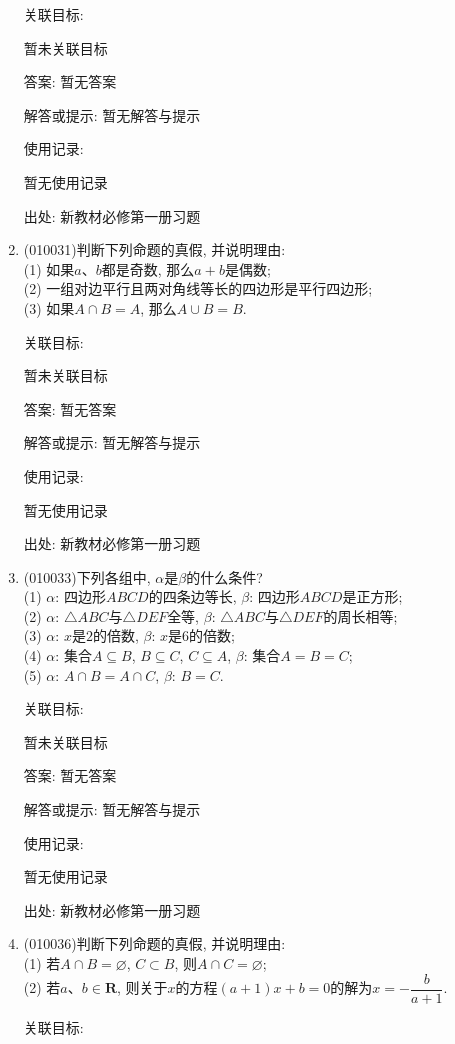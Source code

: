 \documentclass[10pt,a4paper]{article}
\begin{document}
\begin{enumerate}[1.]
关联目标:

暂未关联目标

答案: 暂无答案

解答或提示: 暂无解答与提示

使用记录:

暂无使用记录


出处: 新教材必修第一册习题
\item { (010031)}判断下列命题的真假, 并说明理由:\\
(1) 如果$a$、$b$都是奇数, 那么$a+b$是偶数;\\
(2) 一组对边平行且两对角线等长的四边形是平行四边形;\\
(3) 如果$A\cap B=A$, 那么$A\cup B=B$.


关联目标:

暂未关联目标

答案: 暂无答案

解答或提示: 暂无解答与提示

使用记录:

暂无使用记录


出处: 新教材必修第一册习题
\item { (010033)}下列各组中, $\alpha$是$\beta$的什么条件?\\
(1) $\alpha$: 四边形$ABCD$的四条边等长, $\beta$: 四边形$ABCD$是正方形;\\
(2) $\alpha$: $\triangle ABC$与$\triangle DEF$全等, $\beta$: $\triangle ABC$与$\triangle DEF$的周长相等;\\
(3) $\alpha$: $x$是$2$的倍数, $\beta$: $x$是$6$的倍数;\\
(4) $\alpha$: 集合$A\subseteq B$, $B\subseteq C$, $C\subseteq A$, $\beta$: 集合$A=B=C$;\\
(5) $\alpha$: $A\cap B=A\cap C$, $\beta$: $B=C$.


关联目标:

暂未关联目标

答案: 暂无答案

解答或提示: 暂无解答与提示

使用记录:

暂无使用记录


出处: 新教材必修第一册习题
\item { (010036)}判断下列命题的真假, 并说明理由:\\
(1) 若$A\cap B=\varnothing$, $C\subset B$, 则$A\cap C=\varnothing$;\\
(2) 若$a$、$b\in \mathbf{R}$, 则关于$x$的方程$(a+1)x+b=0$的解为$x=- \dfrac b{a+1}$.


关联目标:


\end{enumerate}
\end{document}
